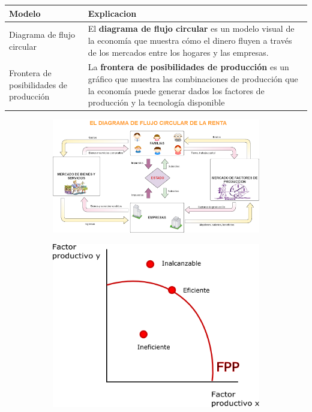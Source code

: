 \begingroup
\setlength{\tabcolsep}{5pt} %
\renewcommand{\arraystretch}{1.5} %
\begin{center}
	\begin{tabular}{p{3.5cm}|p{13cm}}
		Modelo&Explicacion\\ \hline
		Diagrama de flujo circular&El {\bf diagrama de flujo circular} es un modelo visual de la economía que muestra cómo el dinero fluyen a través de los mercados entre los hogares y las empresas.\\
		Frontera de posibilidades de producción& La {\bf frontera de posibilidades de producción} es un gráfico que muestra las combinaciones de producción que la economía puede generar dados los factores de producción y la tecnología disponible
	\end{tabular}
\end{center}
\endgroup
\begingroup
\setlength{\tabcolsep}{5pt} %
\renewcommand{\arraystretch}{1.5} %
\begin{center}
	\begin{figure}[h]
		\centering
\begin{subfigure}	
	\left
	\includegraphics[scale=0.3]{images/FlujoCircular.png}
\end{subfigure} 	
\begin{subfigure}
	\left	
	\includegraphics[scale=0.3]{images/FPP.png}
\end{subfigure} 		
	\end{figure}
\end{center}

